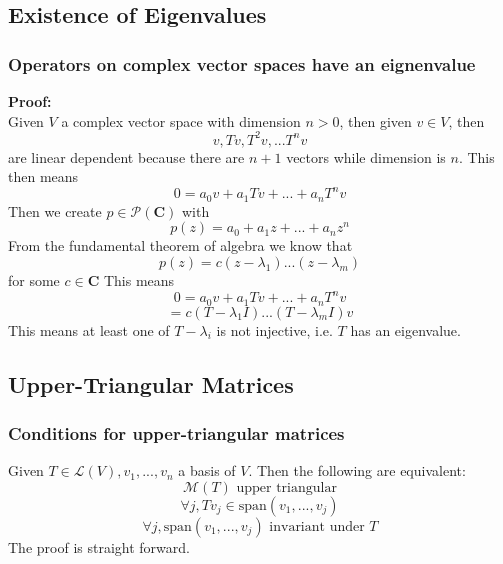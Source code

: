 \documentclass{article}
\begin{document}
\subsection{Existence of Eigenvalues}
\subsubsection{Operators on complex vector spaces have an eignenvalue}
\textbf{Proof:}\\
Given $V$ a complex vector space with dimension $n > 0$, then given $v \in V$, then
\begin{equation*}
    v, Tv, T^2v, ... T^nv
\end{equation*}
are linear dependent because there are $n+1$ vectors while dimension is $n$.
This then means
\begin{equation*}
    0 = a_0v + a_1Tv + ... + a_nT^nv
\end{equation*}
Then we create $p \in \mathcal{P}(\mathbf{C})$ with
\begin{equation*}
    p(z) = a_0 + a_1z + ... + a_nz^n
\end{equation*}
From the fundamental theorem of algebra we know that 
\begin{equation*}
    p(z) = c(z - \lambda_1)...(z - \lambda_m)
\end{equation*}
for some $c \in \mathbf{C}$
This means
\begin{equation*}
    0 = a_0v + a_1Tv + ... + a_nT^nv
\end{equation*}
\begin{equation*}
    = c(T - \lambda_1I)...(T - \lambda_mI)v
\end{equation*}
This means at least one of $T - \lambda_i$ is not injective, i.e. $T$ has an eigenvalue.
\subsection{Upper-Triangular Matrices}
\subsubsection{Conditions for upper-triangular matrices}
Given $T \in \mathcal{L}(V), v_1, ..., v_n$ a basis of $V$. Then the following are equivalent:
\begin{equation*}
    \mathcal{M}(T) \textrm{ upper triangular}
\end{equation*}
\begin{equation*}
    \forall j, Tv_j \in \textrm{span}(v_1, ..., v_j)
\end{equation*}
\begin{equation*}
    \forall j, \textrm{span}(v_1, ..., v_j) \textrm{ invariant under } T
\end{equation*}
The proof is straight forward.
\end{document}
